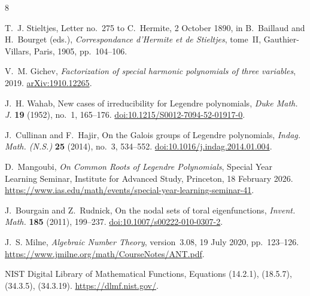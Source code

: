 \documentclass[11pt,a4paper]{article}
\numberwithin{equation}{section}
\theoremstyle{definition}
\begin{document}
\begin{thebibliography}{8}

T.~J. Stieltjes, Letter no.~275 to C.~Hermite, 2 October 1890, in B.~Baillaud and H.~Bourget (eds.), \emph{Correspondance d'Hermite et de Stieltjes}, tome~II, Gauthier-Villars, Paris, 1905, pp.~104--106.

V.~M. Gichev, \emph{Factorization of special harmonic polynomials of three variables}, 2019. \href{https://arxiv.org/abs/1910.12265}{arXiv:1910.12265}.

J.~H. Wahab, New cases of irreducibility for Legendre polynomials, \emph{Duke Math. J.} \textbf{19} (1952), no.~1, 165--176. \href{https://doi.org/10.1215/S0012-7094-52-01917-0}{doi:10.1215/S0012-7094-52-01917-0}.

J.~Cullinan and F.~Hajir, On the Galois groups of Legendre polynomials, \emph{Indag. Math. (N.S.)} \textbf{25} (2014), no.~3, 534--552. \href{https://doi.org/10.1016/j.indag.2014.01.004}{doi:10.1016/j.indag.2014.01.004}.

D.~Mangoubi, \emph{On Common Roots of Legendre Polynomials}, Special Year Learning Seminar, Institute for Advanced Study, Princeton, 18 February 2026. \url{https://www.ias.edu/math/events/special-year-learning-seminar-41}.

J.~Bourgain and Z.~Rudnick, On the nodal sets of toral eigenfunctions, \emph{Invent. Math.} \textbf{185} (2011), 199--237. \href{https://doi.org/10.1007/s00222-010-0307-2}{doi:10.1007/s00222-010-0307-2}.

J.~S. Milne, \emph{Algebraic Number Theory}, version~3.08, 19 July 2020, pp.~123--126. \url{https://www.jmilne.org/math/CourseNotes/ANT.pdf}.

NIST Digital Library of Mathematical Functions, Equations (14.2.1), (18.5.7), (34.3.5), (34.3.19). \url{https://dlmf.nist.gov/}.

\end{thebibliography}
\end{document}
